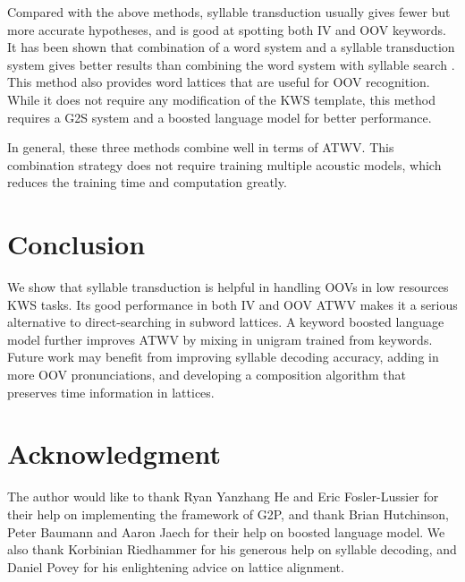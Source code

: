 \documentclass[journal]{IEEEtran}
\begin{document}
Compared with the above methods, syllable transduction usually gives fewer but more accurate hypotheses, and is good 
at spotting both IV and OOV keywords. It has been shown that combination of a word system and a syllable transduction 
system gives better results than combining the word system with syllable search \cite{hang2014syllable}. This method 
also provides word lattices that are useful for OOV recognition. While it does not require any modification 
of the KWS template, this method requires a G2S system and a boosted language model for better performance. 

In general, these three methods combine well in terms of ATWV. This combination strategy does not require
training multiple acoustic models, which reduces the training time and computation greatly.

\section{Conclusion}
We show that syllable transduction is helpful in handling OOVs in low resources KWS tasks. 
Its good performance in both IV and OOV ATWV makes it a serious alternative to direct-searching in subword lattices. 
A keyword boosted language model further improves ATWV by mixing in unigram trained from keywords. Future 
work may benefit from improving syllable decoding accuracy, adding in more OOV pronunciations, and developing a
composition algorithm that preserves time information in lattices.

\section*{Acknowledgment}
The author would like to thank Ryan Yanzhang He and Eric Fosler-Lussier for their help on implementing 
the framework of G2P, and thank Brian Hutchinson, Peter Baumann and Aaron Jaech for their help on 
boosted language model. We also thank Korbinian Riedhammer for his generous help on syllable decoding, 
and Daniel Povey for his enlightening advice on lattice alignment.

\ifCLASSOPTIONcaptionsoff
  \newpage
\fi

\end{document}
